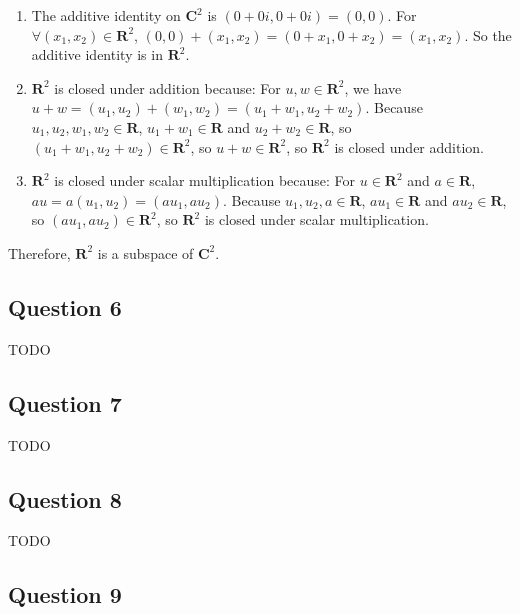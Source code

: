 \documentclass[12pt, letterpaper, oneside]{book}
\begin{document}
\begin{enumerate}
  \item The additive identity on $\mathbf{C}^2$ is $(0 + 0i, 0 + 0i) = (0, 0)$.
        For $\forall (x_1, x_2) \in \mathbf{R}^2$, $(0, 0) + (x_1, x_2) = (0 + x_1,
          0 + x_2) = (x_1, x_2)$. So the additive identity is in $\mathbf{R}^2$.
  \item $\mathbf{R}^2$ is closed under addition because: For $u, w \in
          \mathbf{R}^2$, we have $u + w = (u_1, u_2) + (w_1, w_2) = (u_1 + w_1, u_2 +
          w_2).$ Because $u_1, u_2, w_1, w_2 \in \mathbf{R}$, $u_1 + w_1 \in
          \mathbf{R}$ and $u_2 + w_2 \in \mathbf{R}$, so $(u_1 + w_1, u_2 + w_2) \in
          \mathbf{R}^2$, so $u + w \in \mathbf{R}^2$, so $\mathbf{R}^2$ is closed
        under addition.
  \item $\mathbf{R}^2$ is closed under scalar multiplication because: For $u
          \in \mathbf{R}^2$ and $a \in \mathbf{R}$, $au = a(u_1, u_2) = (a u_1,
          a u_2)$. Because $u_1, u_2, a \in \mathbf{R}$, $a u_1 \in \mathbf{R}$ and
        $a u_2 \in \mathbf{R}$, so $(a u_1, a u_2) \in \mathbf{R}^2$, so
        $\mathbf{R}^2$ is closed under scalar multiplication.
\end{enumerate}

Therefore, $\mathbf{R}^2$ is a subspace of $\mathbf{C}^2$.

\subsection{Question 6}

TODO

\subsection{Question 7}

TODO

\subsection{Question 8}

TODO

\subsection{Question 9}
\end{document}
